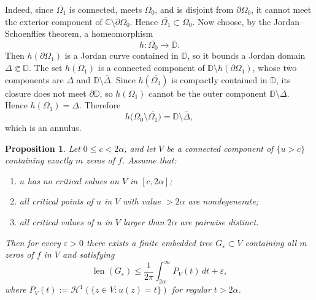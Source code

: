\documentclass[12pt]{amsart}
\theoremstyle{definition}
\newtheorem{proposition}[theorem]{Proposition}
\theoremstyle{remark}
\begin{document}
\smallskip
\noindent
Indeed, since $\overline{\Omega_1}$ is connected, meets $\Omega_0$, and is disjoint from
$\partial\Omega_0$, it cannot meet the exterior component of $\mathbb C\setminus \partial\Omega_0$.
Hence $\overline{\Omega_1}\subset \Omega_0$.
Now choose, by the Jordan--Schoenflies theorem, a homeomorphism
\[
h:\overline{\Omega_0}\to \overline{\mathbb D}.
\]
Then $h(\partial\Omega_1)$ is a Jordan curve contained in $\mathbb D$, so it bounds a Jordan
domain $\Delta\Subset \mathbb D$. The set $h(\Omega_1)$ is a connected component of
$\mathbb D\setminus h(\partial\Omega_1)$, whose two components are $\Delta$ and
$\mathbb D\setminus \overline{\Delta}$. Since $h(\overline{\Omega_1})$ is compactly contained in
$\mathbb D$, its closure does not meet $\partial\mathbb D$, so $h(\Omega_1)$ cannot be the outer
component $\mathbb D\setminus \overline{\Delta}$. Hence $h(\Omega_1)=\Delta$. Therefore
\[
h\bigl(\Omega_0\setminus \overline{\Omega_1}\bigr)=\mathbb D\setminus \overline{\Delta},
\]
which is an annulus.

\medskip
\begin{proposition}\label{prop:generic-spanning-tree}
\emph{Let $0\le c<2\alpha$, and let $V$ be a connected component of $\{u>c\}$ containing exactly $m$
zeros of $f$. Assume that:}
\begin{enumerate}
\item[(a)] \emph{$u$ has no critical values on $V$ in $[c,2\alpha]$;}
\item[(b)] \emph{all critical points of $u$ in $V$ with value $>2\alpha$ are nondegenerate;}
\item[(c)] \emph{all critical values of $u$ in $V$ larger than $2\alpha$ are pairwise distinct.}
\end{enumerate}
\emph{Then for every $\varepsilon>0$ there exists a finite embedded tree $G_\varepsilon\subset V$ containing all $m$ zeros of $f$ in $V$
and satisfying}
\begin{equation}
\operatorname{len}(G_\varepsilon)\le \frac{1}{2\pi}\int_{2\alpha}^{\infty} P_V(t)\,dt+\varepsilon,
\tag{10}
\end{equation}
\emph{where $P_V(t):=\mathcal H^1(\{z\in V:u(z)=t\})$ for regular $t>2\alpha$.}
\end{proposition}
\end{document}

